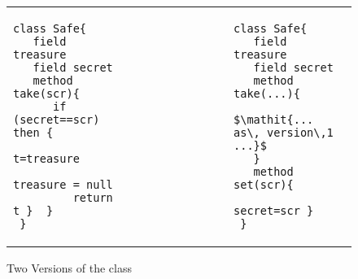  \begin{figure}[htb]
 \begin{tabular}{lll} %
\begin{minipage}{0.45\textwidth}
\begin{lstlisting}
class Safe{
   field treasure 
   field secret 
   method take(scr){
      if (secret==scr) then {
         t=treasure
         treasure = null
         return t }  }
 }
\end{lstlisting}
\end{minipage}
  &\ \ \  \ \ \ \ \  \ \ \ \ \ \ &
\begin{minipage}{0.45\textwidth}
\begin{lstlisting}
class Safe{
   field treasure   
   field secret  
   method take(...){
       $\mathit{... as\, version\,1 ...}$ 
   }
   method set(scr){
         secret=scr }
 }
\end{lstlisting}
\end{minipage} 
 \end{tabular}
  \vspace*{-0.95cm}
  \caption{Two Versions of the class }
 \label{fig:ExampleSafe}
 \vspace*{-0.65cm}
 \end{figure}
 

